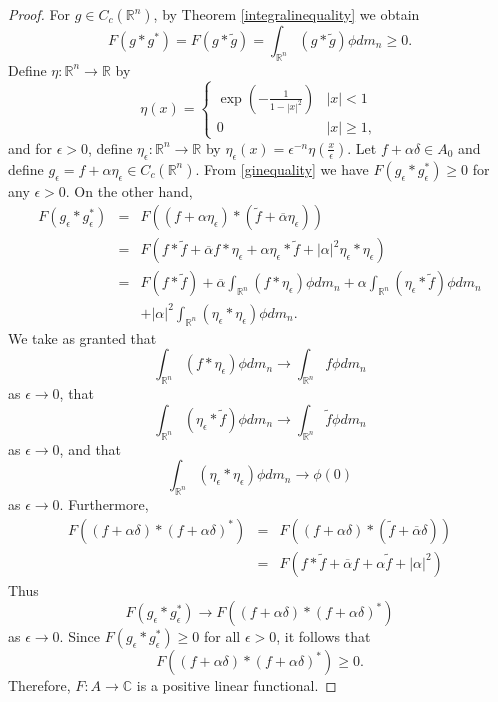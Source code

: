 \documentclass{article}
\theoremstyle{definition}
\theoremstyle{definition}
\begin{document}
\begin{proof}
For $g \in C_c(\mathbb{R}^n)$, by Theorem \ref{integralinequality} we obtain
\begin{equation}
F(g*g^*)=F(g*\widetilde{g})=\int_{\mathbb{R}^n} (g*\widetilde{g}) \phi dm_n \geq 0.
\label{ginequality}
\end{equation}
Define  $\eta:\mathbb{R}^n \to \mathbb{R}$ by
\[
\eta(x) = \begin{cases}
\exp\left(-\frac{1}{1-|x|^2}\right)&|x|<1\\
0&|x| \geq 1,
\end{cases}
\]
and for $\epsilon>0$, define $\eta_\epsilon:\mathbb{R}^n \to \mathbb{R}$ by $\eta_\epsilon(x) = \epsilon^{-n} \eta\left(\frac{x}{\epsilon}\right)$.
Let $f+\alpha \delta \in A_0$ and define
$g_\epsilon = f+\alpha \eta_\epsilon \in C_c(\mathbb{R}^n)$. 
From \eqref{ginequality} we have $F(g_\epsilon*g_\epsilon^*) \geq 0$ for any $\epsilon>0$. 
On the other hand,
\begin{eqnarray*}
F(g_\epsilon*g_\epsilon^*)&=&F((f+\alpha \eta_\epsilon)*(\widetilde{f}+\overline{\alpha}\eta_\epsilon))\\
&=&F(f*\widetilde{f}+\overline{\alpha} f*\eta_\epsilon+\alpha \eta_\epsilon*\widetilde{f}+|\alpha|^2 \eta_\epsilon*\eta_\epsilon)\\
&=&F(f*\widetilde{f})+\overline{\alpha} \int_{\mathbb{R}^n} (f*\eta_\epsilon)\phi dm_n + \alpha \int_{\mathbb{R}^n} (\eta_\epsilon*\widetilde{f})\phi dm_n\\
&&+|\alpha|^2 \int_{\mathbb{R}^n} (\eta_\epsilon*\eta_\epsilon)\phi dm_n.
\end{eqnarray*}
We take as granted that
\[
\int_{\mathbb{R}^n} (f*\eta_\epsilon)\phi dm_n \to \int_{\mathbb{R}^n} f\phi dm_n
\]
as $\epsilon \to 0$,
 that
\[
\int_{\mathbb{R}^n} (\eta_\epsilon * \widetilde{f})\phi dm_n \to \int_{\mathbb{R}^n} \widetilde{f} \phi dm_n
\]
as $\epsilon \to 0$, and that
\[
\int_{\mathbb{R}^n} (\eta_\epsilon*\eta_\epsilon)\phi dm_n \to \phi(0)
\]
as $\epsilon \to 0$.
Furthermore, 
\begin{eqnarray*}
F((f+\alpha \delta)*(f+\alpha \delta)^*)&=&F((f+\alpha \delta)*(\widetilde{f}+\overline{\alpha}\delta))\\
&=&F(f*\widetilde{f}+\overline{\alpha}f+\alpha \widetilde{f}+|\alpha|^2)
\end{eqnarray*}
Thus
\[
F(g_\epsilon*g_\epsilon^*) \to F((f+\alpha \delta)*(f+\alpha \delta)^*)
\]
as $\epsilon \to 0$. Since $F(g_\epsilon * g_\epsilon^*) \geq 0$ for all $\epsilon>0$, it follows that
\[
F((f+\alpha \delta)*(f+\alpha \delta)^*) \geq 0.
\]
Therefore, $F:A \to \mathbb{C}$ is a positive linear functional.


\end{proof}
\end{document}
